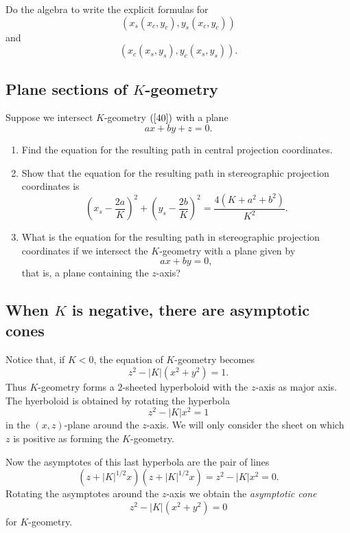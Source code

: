 \documentclass{ximera}
\begin{document}
\begin{exercise}
Do the algebra to write the explicit formulas for%
\[
\left(  x_{s}\left(  x_{c},y_{c}\right)  ,y_{s}\left(  x_{c},y_{c}\right)
\right)
\]
and%
\[
\left(  x_{c}\left(  x_{s},y_{s}\right)  ,y_{c}\left(  x_{s},y_{s}\right)
\right)  .
\]

\end{exercise}

\subsection*{Plane sections of $K$-geometry}

\begin{exercise}
\label{73}Suppose we intersect $K$-geometry $\left(  \ref{40}\right)  $ with a
plane%
\[
ax+by+z=0.
\]

\begin{enumerate}
\item Find the equation for the resulting path in central projection coordinates.
\item Show that the equation for the resulting path in stereographic projection
coordinates is%
\[
\left(  x_{s}-\frac{2a}{K}\right)  ^{2}+\left(  y_{s}-\frac{2b}{K}\right)
^{2}=\frac{4\left(  K+a^{2}+b^{2}\right)  }{K^{2}}.
\]
\item What is the equation for the resulting path in stereographic projection
coordinates if we intersect the $K$-geometry with a plane given by%
\[
ax+by=0,
\]
that is, a plane containing the $z$-axis?
\end{enumerate}
\end{exercise}

\subsection*{When $K$ is negative, there are asymptotic cones}

Notice that, if $K<0$, the equation of $K$-geometry becomes%
\[
z^{2}-\left\vert K\right\vert \left(  x^{2}+y^{2}\right)  =1.
\]
Thus $K$-geometry forms a $2$-sheeted hyperboloid with the $z$-axis as major
axis. The hyerboloid is obtained by rotating the hyperbola%
\begin{equation}
z^{2}-\left\vert K\right\vert x^{2}=1 \label{hyp}%
\end{equation}
in the $\left(  x,z\right)  $-plane around the $z$-axis. We will only consider
the sheet on which $z$ is positive as forming the $K$-geometry.

Now the asymptotes of this last hyperbola are the pair of lines%
\[
\left(  z+\left\vert K\right\vert ^{1/2}x\right)  \left(  z+\left\vert
K\right\vert ^{1/2}x\right)  =z^{2}-\left\vert K\right\vert x^{2}=0.
\]
Rotating the asymptotes around the $z$-axis we obtain the \textit{asymptotic
cone}%
\[
z^{2}-\left\vert K\right\vert \left(  x^{2}+y^{2}\right)  =0
\]
for $K$-geometry.
\end{document}
